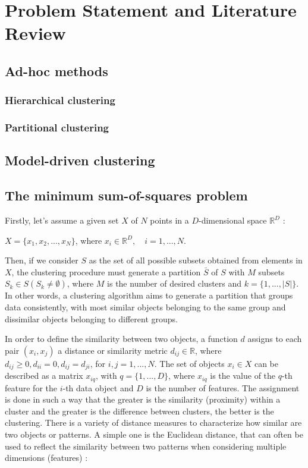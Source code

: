 \chapter{Problem Statement and Literature Review}

\section{Ad-hoc methods}

\subsection{Hierarchical clustering}

\subsection{Partitional clustering}

\section{Model-driven clustering}

\section{The minimum sum-of-squares problem}
Firstly, let's assume a given set $X$ of $N$ points in a $D$-dimensional space $\mathbb{R}^D$ \cite{Bagirov2006}:

\begin{center}%
$X = \{x_1, x_2, ..., x_N\}$, where $x_i \in \mathbb{R}^D, \quad i = 1, ..., N.$
\end{center}

Then, if we consider $S$ as the set of all possible subsets obtained from elements in $X$, the clustering procedure must generate a partition $\bar{S}$ of $S$ with $M$ subsets $S_k \in S (S_k \neq \emptyset)$, where $M$ is the number of desired clusters and $k = \{1,...,\left | S \right |\}$. In other words, a clustering algorithm aims to generate a partition that groups data consistently, with most similar objects belonging to the same group and dissimilar objects belonging to different groups.

In order to define the similarity between two objects, a function $d$ assigns to each pair $(x_i, x_j)$ a distance or similarity metric $d_{ij} \in \mathbb{R}$, where $d_{ij} \geq 0, d_{ii} = 0, d_{ij} = d_{ji}$, for $i, j = 1, ... ,N$. The set of objects $x_i \in X$ can be described as a matrix $x_{iq}$, with $q = \{1,...,D\}$, where $x_{iq}$ is the value of the $q$-th feature for the $i$-th data object and $D$ is the number of features. The assignment is done in such a way that the greater is the similarity (proximity) within a cluster and the greater is the difference between clusters, the better is the clustering. There is a variety of distance measures to characterize how similar are two objects or patterns. A simple one is the Euclidean distance, that can often be used to reflect the similarity between two patterns when considering multiple dimensions (features) \cite{Jain1999}:

